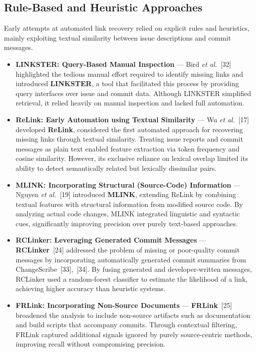 \subsection{Rule-Based and Heuristic Approaches}
Early attempts at automated link recovery relied on explicit rules and heuristics, mainly exploiting textual similarity between issue descriptions and commit messages.
\begin{itemize}
    \item \textbf{LINKSTER: Query-Based Manual Inspection} --- Bird \textit{et al.}~[32] highlighted the tedious manual effort required to identify missing links and introduced \textbf{LINKSTER}, a tool that facilitated this process by providing query interfaces over issue and commit data. Although LINKSTER simplified retrieval, it relied heavily on manual inspection and lacked full automation.
    \item \textbf{ReLink: Early Automation using Textual Similarity} --- Wu \textit{et al.}~[17] developed \textbf{ReLink}, considered the first automated approach for recovering missing links through textual similarity. Treating issue reports and commit messages as plain text enabled feature extraction via token frequency and cosine similarity. However, its exclusive reliance on lexical overlap limited its ability to detect semantically related but lexically dissimilar pairs.
    \item \textbf{MLINK: Incorporating Structural (Source-Code) Information} --- Nguyen \textit{et al.}~[19] introduced \textbf{MLINK}, extending ReLink by combining textual features with structural information from modified source code. By analyzing actual code changes, MLINK integrated linguistic and syntactic cues, significantly improving precision over purely text-based approaches.
    \item \textbf{RCLinker: Leveraging Generated Commit Messages} --- \textbf{RCLinker}~[24] addressed the problem of missing or poor-quality commit messages by incorporating automatically generated commit summaries from ChangeScribe~[33],~[34]. By fusing generated and developer-written messages, RCLinker used a random-forest classifier to estimate the likelihood of a link, achieving higher accuracy than heuristic systems.
    \item \textbf{FRLink: Incorporating Non-Source Documents} --- \textbf{FRLink}~[25] broadened the analysis to include non-source artifacts such as documentation and build scripts that accompany commits. Through contextual filtering, FRLink captured additional signals ignored by purely source-centric methods, improving recall without compromising precision.

\end{itemize}
